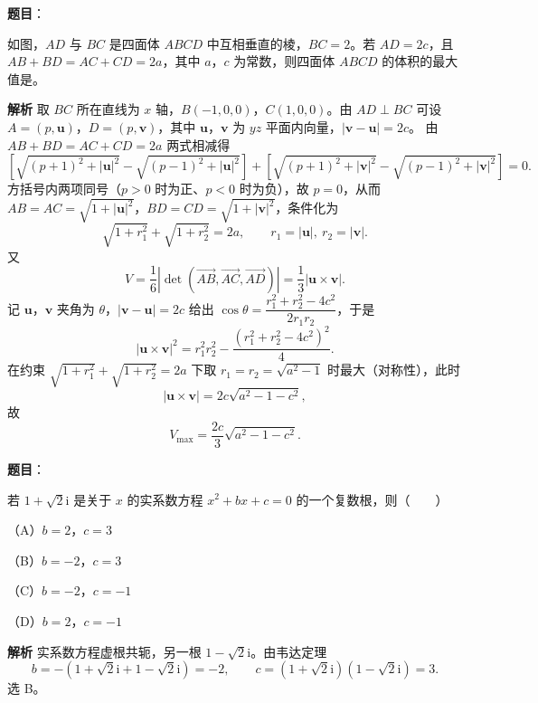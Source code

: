 \begin{answer}

\textbf{题目}：

如图，$AD$ 与 $BC$ 是四面体 $ABCD$ 中互相垂直的棱，$BC=2$。若 $AD=2c$，且 $AB+BD=AC+CD=2a$，其中 $a$，$c$ 为常数，则四面体 $ABCD$ 的体积的最大值是\gkblank{}。
\nopagebreak[4]
\begin{center}\end{center}
\nopagebreak[4]
\textbf{解析}
取 $BC$ 所在直线为 $x$ 轴，$B(-1,0,0)$，$C(1,0,0)$。由 $AD\perp BC$ 可设 $A=(p,\boldsymbol u)$，$D=(p,\boldsymbol v)$，其中 $\boldsymbol u$，$\boldsymbol v$ 为 $yz$ 平面内向量，$|\boldsymbol v-\boldsymbol u|=2c$。
由 $AB+BD=AC+CD=2a$ 两式相减得
\nopagebreak[4]
\[\left[\sqrt{(p+1)^2+|\boldsymbol u|^2}-\sqrt{(p-1)^2+|\boldsymbol u|^2}\right]+\left[\sqrt{(p+1)^2+|\boldsymbol v|^2}-\sqrt{(p-1)^2+|\boldsymbol v|^2}\right]=0.\]
方括号内两项同号（$p>0$ 时为正、$p<0$ 时为负），故 $p=0$，从而 $AB=AC=\sqrt{1+|\boldsymbol u|^2}$，$BD=CD=\sqrt{1+|\boldsymbol v|^2}$，条件化为
\nopagebreak[4]
\[\sqrt{1+r_1^2}+\sqrt{1+r_2^2}=2a,\qquad r_1=|\boldsymbol u|,\ r_2=|\boldsymbol v|.\]
又
\nopagebreak[4]
\[V=\frac16\left|\det(\overrightarrow{AB},\overrightarrow{AC},\overrightarrow{AD})\right|=\frac13|\boldsymbol u\times\boldsymbol v|.\]
记 $\boldsymbol u$，$\boldsymbol v$ 夹角为 $\theta$，$|\boldsymbol v-\boldsymbol u|=2c$ 给出 $\cos\theta=\dfrac{r_1^2+r_2^2-4c^2}{2r_1r_2}$，于是
\nopagebreak[4]
\[|\boldsymbol u\times\boldsymbol v|^2=r_1^2r_2^2-\frac{(r_1^2+r_2^2-4c^2)^2}4.\]
在约束 $\sqrt{1+r_1^2}+\sqrt{1+r_2^2}=2a$ 下取 $r_1=r_2=\sqrt{a^2-1}$ 时最大（对称性），此时
\nopagebreak[4]
\[|\boldsymbol u\times\boldsymbol v|=2c\sqrt{a^2-1-c^2},\]
故
\nopagebreak[4]
\[V_{\max}=\frac{2c}3\sqrt{a^2-1-c^2}.\]


\end{answer}
\begin{answer}

\textbf{题目}：

若 $1+\sqrt2\mathrm i$ 是关于 $x$ 的实系数方程 $x^2+bx+c=0$ 的一个复数根，则\mbox{（　　）}

（A）$b=2$，$c=3$

（B）$b=-2$，$c=3$

（C）$b=-2$，$c=-1$

（D）$b=2$，$c=-1$

\textbf{解析}
实系数方程虚根共轭，另一根 $1-\sqrt2\mathrm i$。由韦达定理
\nopagebreak[4]
\[b=-(1+\sqrt2\mathrm i+1-\sqrt2\mathrm i)=-2,\qquad c=(1+\sqrt2\mathrm i)(1-\sqrt2\mathrm i)=3.\]
选 B。


\end{answer}
